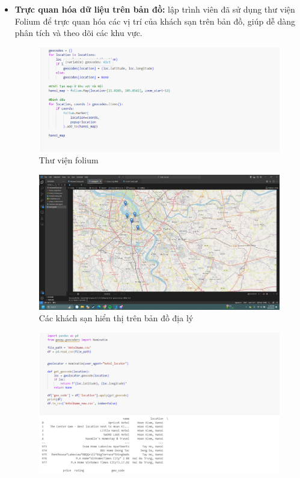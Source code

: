 \begin{itemize}
    \item \textbf{Trực quan hóa dữ liệu trên bản đồ:} lập trình viên đã sử dụng thư viện Folium để trực quan hóa các vị trí của khách sạn trên bản đồ, giúp dễ dàng phân tích và theo dõi các khu vực.
    \begin{figure}[H] %
        \centering
        \includegraphics[width=1.0\linewidth]{Figures/2.11.png}
        \caption{Thư viện folium}
        \label{fig:iot}
    \end{figure}
    \begin{figure}[H] %
        \centering
        \includegraphics[width=1.0\linewidth]{Figures/2.12.png}
        \caption{Các khách sạn hiển thị trên bản đồ địa lý}
        \label{fig:iot}
    \end{figure}
    \begin{figure}[H] %
        \centering
        \includegraphics[width=1.0\linewidth]{Figures/2.13.png}

\end{figure}
\end{itemize}
